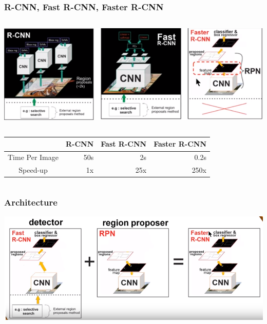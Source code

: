 \documentclass{beamer}
\begin{document}
     \begin{frame}
        \frametitle{R-CNN, Fast R-CNN, Faster R-CNN}
        \begin{columns}
            \begin{column}{1.0\textwidth}
              \begin{column}{0.4\textwidth}
                  \includegraphics[width=2.5\textwidth]{images/RCNN.png}
                  \begin{center}
                  \end{center}
            \end{column}
            \begin{center}
            \begin{tabular}{c rrr} 
            \hline
              & R-CNN & Fast R-CNN & Faster R-CNN \\ 
            \hline
            Time Per Image & 50s & 2s & 0.2s \\ 
            \hline
            Speed-up & 1x & 25x & 250x\\ 
            \hline
            \end{tabular}
            \end{center}
            \end{column}
        \end{columns}
    \end{frame}
    
    \begin{frame}
       \frametitle{Architecture}
       \centering
         \includegraphics[width=1.0\textwidth]{images/architecture.PNG}
    \end{frame}
    
\end{document}
